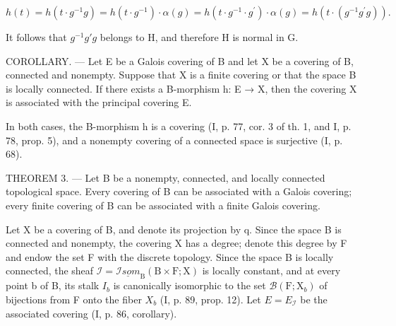 \[
h (t) = h \left(t \cdot g ^ {- 1} g\right) = h \left(t \cdot g ^ {- 1}\right) \cdot \alpha (g) = h \left(t \cdot g ^ {- 1} \cdot g ^ {\prime}\right) \cdot \alpha (g) = h \left(t \cdot \left(g ^ {- 1} g ^ {\prime} g\right)\right).
\]

It follows that \(g^{-1}g'g\) belongs to H, and therefore H is normal in G.

COROLLARY. --- Let E be a Galois covering of B and let X be a covering of B, connected and nonempty. Suppose that X is a finite covering or that the space B is locally connected. If there exists a B-morphism h: E → X, then the covering X is associated with the principal covering E.

In both cases, the B-morphism h is a covering (I, p. 77, cor. 3 of th. 1, and I, p. 78, prop. 5), and a nonempty covering of a connected space is surjective (I, p. 68).

THEOREM 3. --- Let B be a nonempty, connected, and locally connected topological space. Every covering of B can be associated with a Galois covering; every finite covering of B can be associated with a finite Galois covering.

Let X be a covering of B, and denote its projection by q. Since the space B is connected and nonempty, the covering X has a degree; denote this degree by F and endow the set F with the discrete topology. Since the space B is locally connected, the sheaf \(\mathcal{I} = \underline{\mathcal{I}som}_{\mathrm{B}}(\mathrm{B} \times \mathrm{F}; \mathrm{X})\) is locally constant, and at every point b of B, its stalk \(I_{b}\) is canonically isomorphic to the set \(\mathcal{B}(\mathrm{F}; \mathrm{X}_{b})\) of bijections from F onto the fiber \(X_{b}\) (I, p. 89, prop. 12). Let \(E = E_{\mathcal{I}}\) be the associated covering (I, p. 86, corollary).

